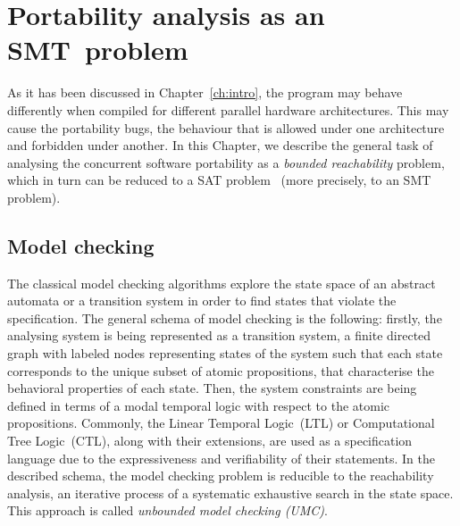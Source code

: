\chapter{Portability analysis as an SMT~problem}
\label{ch:port}

As it has been discussed in Chapter~\ref{ch:intro}, the program may behave differently when compiled for different parallel hardware architectures. This may cause the portability bugs, the behaviour that is allowed under one architecture and forbidden under another. 
In this Chapter, we describe the general task of analysing the concurrent software portability
as a \textit{bounded reachability} problem, which in turn can be reduced to a SAT problem~\cite{Porthos17} (more precisely, to an SMT problem).


\section{Model checking}
\label{ch:port:mc}

The classical model checking algorithms explore the state space of an abstract automata or a transition system in order to find states that violate the specification. The general schema of model checking is the following: firstly, the analysing system is being represented as a transition system, a finite directed graph with labeled nodes representing states of the system such that each state corresponds to the unique subset of atomic propositions, that characterise the behavioral properties of each state. 
Then, the system constraints are being defined in terms of a modal temporal logic with respect to the atomic propositions. Commonly, the Linear Temporal Logic~(LTL) or Computational Tree Logic~(CTL), along with their extensions, are used as a specification language due to the expressiveness and verifiability of their statements. 
In the described schema, the model checking problem is reducible to the reachability analysis, an iterative process of a systematic exhaustive search in the state space. This approach is called \textit{unbounded model checking (UMC)}.

